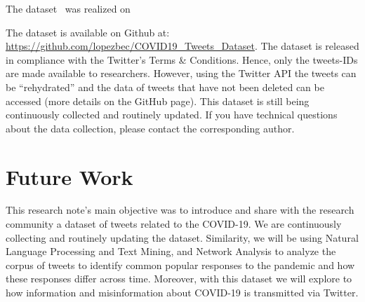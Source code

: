 \documentclass{article}
\begin{document}
The dataset \version\ was realized on \date. The dataset is available on Github at:  \url{https://github.com/lopezbec/COVID19_Tweets_Dataset}. The dataset is released in compliance with the Twitter’s Terms \& Conditions. Hence, only the tweets-IDs are made available to researchers. However, using the Twitter API the tweets can be “rehydrated” and the data of tweets that have not been deleted can be accessed (more details on the GitHub page). This dataset is still being continuously collected and routinely updated. If you have technical questions about the data collection, please contact the corresponding author.


\section{Future Work}

This research note’s main objective was to introduce and share with the research community a dataset of tweets related to the COVID-19. We are continuously collecting and routinely updating the dataset. Similarity, we will be using Natural Language Processing and Text Mining, and Network Analysis to analyze the corpus of tweets to identify common popular responses to the pandemic and how these responses differ across time. Moreover, with this dataset we will explore to how information and misinformation about COVID-19 is transmitted via Twitter.
\end{document}
